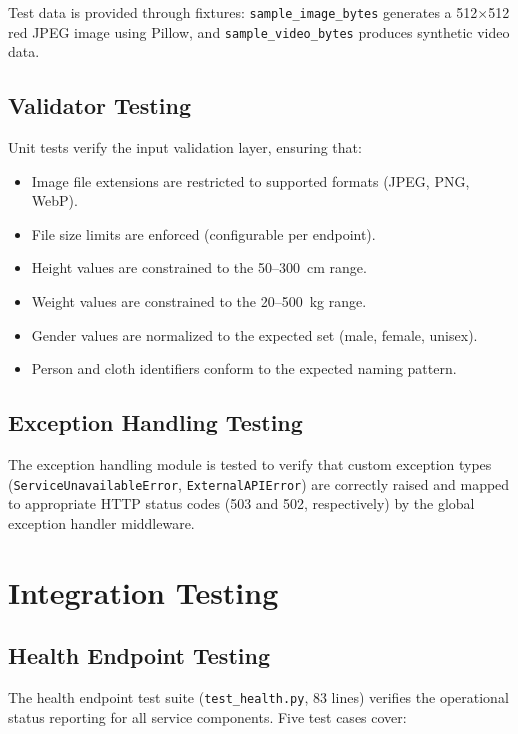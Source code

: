 Test data is provided through fixtures: \texttt{sample\_image\_bytes} generates a 512$\times$512 red JPEG image using Pillow, and \texttt{sample\_video\_bytes} produces synthetic video data.

\subsection{Validator Testing}

Unit tests verify the input validation layer, ensuring that:
\begin{itemize}[leftmargin=*]
    \item Image file extensions are restricted to supported formats (JPEG, PNG, WebP).
    \item File size limits are enforced (configurable per endpoint).
    \item Height values are constrained to the 50--300~cm range.
    \item Weight values are constrained to the 20--500~kg range.
    \item Gender values are normalized to the expected set (male, female, unisex).
    \item Person and cloth identifiers conform to the expected naming pattern.
\end{itemize}

\subsection{Exception Handling Testing}

The exception handling module is tested to verify that custom exception types (\texttt{ServiceUnavailableError}, \texttt{ExternalAPIError}) are correctly raised and mapped to appropriate HTTP status codes (503 and 502, respectively) by the global exception handler middleware.

\section{Integration Testing}
\label{sec:test-integration}

\subsection{Health Endpoint Testing}

The health endpoint test suite (\texttt{test\_health.py}, 83 lines) verifies the operational status reporting for all service components. Five test cases cover:

